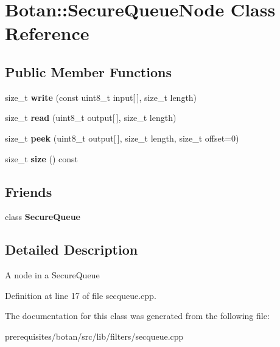 \hypertarget{class_botan_1_1_secure_queue_node}{}\section{Botan\+:\+:Secure\+Queue\+Node Class Reference}
\label{class_botan_1_1_secure_queue_node}
\subsection*{Public Member Functions}
\begin{DoxyCompactItemize}
\item 
\mbox{\label{class_botan_1_1_secure_queue_node_a42783e4ceac5215c64c22000214b1e03}} 
size\+\_\+t {\bfseries write} (const uint8\+\_\+t input\mbox{[}$\,$\mbox{]}, size\+\_\+t length)
\item 
\mbox{\label{class_botan_1_1_secure_queue_node_a803f1b78ee79fb12d9cbc1d2a7393696}} 
size\+\_\+t {\bfseries read} (uint8\+\_\+t output\mbox{[}$\,$\mbox{]}, size\+\_\+t length)
\item 
\mbox{\label{class_botan_1_1_secure_queue_node_a77ee4d458f326760b4ae26d87b24b668}} 
size\+\_\+t {\bfseries peek} (uint8\+\_\+t output\mbox{[}$\,$\mbox{]}, size\+\_\+t length, size\+\_\+t offset=0)
\item 
\mbox{\label{class_botan_1_1_secure_queue_node_ac1de91ef864e4e665246f555f6d04277}} 
size\+\_\+t {\bfseries size} () const
\end{DoxyCompactItemize}
\subsection*{Friends}
\begin{DoxyCompactItemize}
\item 
\mbox{\label{class_botan_1_1_secure_queue_node_a8b4ec14d48384543a43b875cba10512e}} 
class {\bfseries Secure\+Queue}
\end{DoxyCompactItemize}


\subsection{Detailed Description}
A node in a Secure\+Queue 

Definition at line 17 of file secqueue.\+cpp.



The documentation for this class was generated from the following file\+:\begin{DoxyCompactItemize}
\item 
prerequisites/botan/src/lib/filters/secqueue.\+cpp\end{DoxyCompactItemize}
